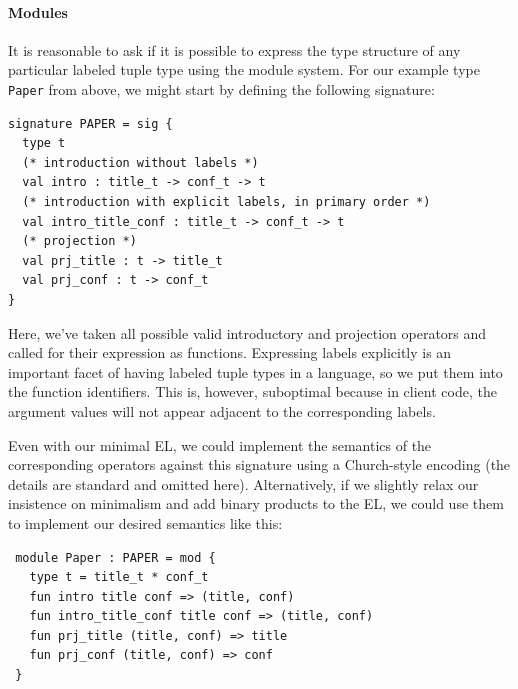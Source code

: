 \paragraph{Modules}
It is reasonable to ask if it is possible to express the type structure of any particular labeled tuple type using the module system.  %
For our example type \lstinline{Paper} from above, we might start by defining the following signature:
\begin{lstlisting}
signature PAPER = sig {
  type t
  (* introduction without labels *)
  val intro : title_t -> conf_t -> t
  (* introduction with explicit labels, in primary order *)
  val intro_title_conf : title_t -> conf_t -> t
  (* projection *)
  val prj_title : t -> title_t
  val prj_conf : t -> conf_t
}
\end{lstlisting}
Here, we've taken all possible valid introductory and projection operators and called for their expression as functions. Expressing labels explicitly is an important facet of having labeled tuple types in a language, so we put them into the function identifiers. This is, however, suboptimal because in client code, the argument values will not appear adjacent to the corresponding labels. 

Even with our minimal EL, we could  implement the semantics of the corresponding operators against this signature using a Church-style encoding (the details are standard and omitted here). Alternatively, if we slightly relax  our insistence on minimalism and add binary products to the EL, we could use them to implement our desired semantics like this:
\begin{lstlisting}
 module Paper : PAPER = mod {
   type t = title_t * conf_t
   fun intro title conf => (title, conf)
   fun intro_title_conf title conf => (title, conf)
   fun prj_title (title, conf) => title 
   fun prj_conf (title, conf) => conf
 }
 \end{lstlisting}

